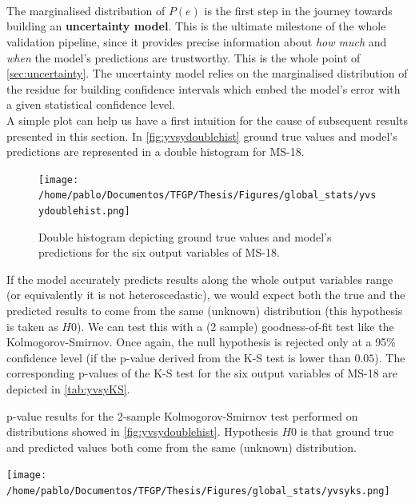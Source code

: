 \paragraph{ \\}
The marginalised distribution of $P(e)$ is the first step in the journey towards building an \textbf{uncertainty model}. This is the ultimate milestone of the whole validation pipeline, since it provides precise information about \textit{how much} and \textit{when} the model's predictions are trustworthy. This is the whole point of \autoref{sec:uncertainty}. The uncertainty model relies on the marginalised distribution of the residue for building confidence intervals which embed the model's error with a given statistical confidence level.\\
%
\indent A simple plot can help us have a first intuition for the cause of subsequent results presented in this section. In \autoref{fig:yvsydoublehist} ground true values and model's predictions are represented in a double histogram for MS-18.\\
\begin{figure}
	\centering
	\texttt{[image: /home/pablo/Documentos/TFGP/Thesis/Figures/global\_stats/yvsydoublehist.png]}
	\caption{Double histogram depicting ground true values and model's predictions for the six output variables of MS-18.}
	\label{fig:yvsydoublehist}
\end{figure}
%
\indent If the model accurately predicts results along the whole output variables range (or equivalently it is not heteroscedastic), we would expect both the true and the predicted results to come from the same (unknown) distribution (this hypothesis is taken as $H0$). We can test this with a (2 sample) goodness-of-fit test like the Kolmogorov-Smirnov. Once again, the null hypothesis is rejected only at a 95\% confidence level (\ie if the p-value derived from the K-S test is lower than $0.05$). The corresponding p-values of the K-S test for the six output variables of MS-18 are depicted in \autoref{tab:yvsyKS}.\\
\begin{table}
	\centering
	\caption{p-value results for the 2-sample Kolmogorov-Smirnov test performed on distributions showed in \autoref{fig:yvsydoublehist}. Hypothesis $H0$ is that ground true and predicted values both come from the same (unknown) distribution.}
	\texttt{[image: /home/pablo/Documentos/TFGP/Thesis/Figures/global\_stats/yvsyks.png]}
	\label{tab:yvsyKS}
\end{table}
